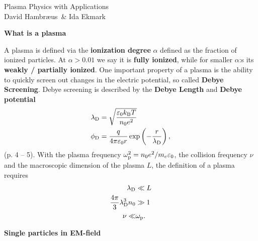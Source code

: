\documentclass[10pt,landscape]{article}
\newcommand{\topiccolor}{green}
\renewcommand{\section}[2]{%
	\renewcommand{\topiccolor}{#2}
	\begin{tcolorbox}[boxsep=0.5mm, left=1mm, right=1mm, top=0mm, bottom=0mm,
		colback=#2!30, colframe=#2, arc is angular]%
		\centering \textbf{#1}%
	\end{tcolorbox}%
	\nopagebreak%
}
\newcommand{\cbf}[1]{\textcolor{\topiccolor!80!black}{\textbf{#1}}}
\begin{document}
\begin{multicols*}{3}
\begin{tcolorbox}[colframe=black, colback=white]
\centering \large Plasma Physics with Applications\\
\small David Hambr\ae{}us \& Ida Ekmark
\end{tcolorbox}

\section{What is a plasma}{pink}
A plasma is defined via the \cbf{ionization degree} $\alpha$ defined as the
fraction of ionized particles. At $\alpha > 0.01$ we say it is 
\cbf{fully ionized}, while for smaller $\alpha$:s its 
\cbf{weakly / partially ionized}.
One important property of a plasma is the ability to quickly screen out changes
in the electric potential, so called \cbf{Debye Screening}.
Debye screening is described by the \cbf{Debye Length} and \cbf{Debye potential}
\begin{align*}
	\lambda_{\rm D} &= \sqrt{\frac{\varepsilon_0 k_{\rm B} T}{n_0e^2}}\\
	\phi_{\rm D} &= \frac{q}{4\pi\varepsilon_0 r}\exp\left(-\frac{r}{\lambda_{\rm D}}\right),
\end{align*}
(p. 4 -- 5).
With the plasma frequency $\omega_{\rm p}^2=n_0e^2/m_e\varepsilon_0$, the collision frequency $\nu$ and the macroscopic dimension of the plasma $L$, the definition of a plasma requires
\begin{align*}
	\lambda_{\rm D} &\ll L\\
	\frac{4\pi}{3}\lambda_{\rm D}^3n_0 &\gg 1\\
	\nu \ll &\omega_{\rm p}.
\end{align*}

\section{Single particles in EM-field}{orange}


\end{multicols*}
\end{document}
